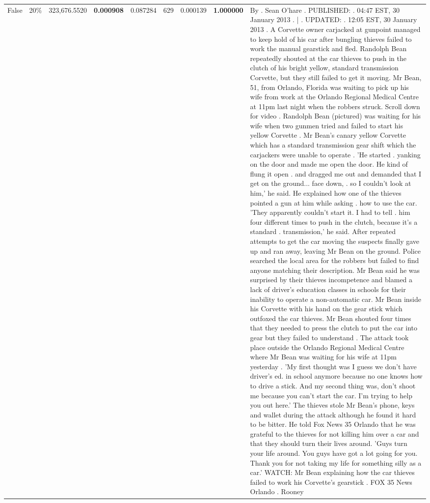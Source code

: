 \begin{table}[H]
\begin{tabular}{llrrrrrrl}
\multirow[c]{16}{*}{False} & 20\% & 323,676.5520 & \bfseries \color{red} 0.000908 & 0.087284 & \color{red} 629 & 0.000139 & \bfseries \color{red} 1.000000 & By . Sean O'hare . PUBLISHED: . 04:47 EST, 30 January 2013 . | . UPDATED: . 12:05 EST, 30 January 2013 . A Corvette owner carjacked at gunpoint managed to keep hold of his car after bungling thieves failed to work the manual gearstick and fled. Randolph Bean repeatedly shouted at the car thieves to push in the clutch of his bright yellow, standard transmission Corvette, but they still failed to get it moving. Mr Bean, 51, from Orlando, Florida was waiting to pick up his wife from work at the Orlando Regional Medical Centre at 11pm last night when the robbers struck. Scroll down for video . Randolph Bean (pictured) was waiting for his wife when two gunmen tried and failed to start his yellow Corvette . Mr Bean's canary yellow Corvette which has a standard transmission gear shift which the carjackers were unable to operate . 'He started . yanking on the door and made me open the door. He kind of flung it open . and dragged me out and demanded that I get on the ground... face down, . so I couldn't look at him,' he said. He explained how one of the thieves pointed a gun at him while asking . how to use the car. 'They apparently couldn't start it. I had to tell . him four different times to push in the clutch, because it's a standard . transmission,' he said. After repeated attempts to get the car moving the suspects finally gave up and ran away, leaving Mr Bean on the ground. Police searched the local area for the robbers but failed to find anyone matching their description. Mr Bean said he was surprised by their thieves incompetence and blamed a lack of driver's education classes in schools for their inability to operate a non-automatic car. Mr Bean inside his Corvette with his hand on the gear stick which outfoxed the car thieves. Mr Bean shouted four times that they needed to press the clutch to put the car into gear but they failed to understand . The attack took place outside the Orlando Regional Medical Centre where Mr Bean was waiting for his wife at 11pm yesterday . 'My first thought was I guess we don't have driver's ed. in school anymore because no one knows how to drive a stick. And my second thing was, don't shoot me because you can't start the car. I'm trying to help you out here.' The thieves stole Mr Bean's phone, keys and wallet during the attack although he found it hard to be bitter. He told Fox News 35 Orlando that he was grateful to the thieves for not killing him over a car and that they should turn their lives around. 'Guys turn your life around. You guys have got a lot going for you. Thank you for not taking my life for something silly as a car.' WATCH: Mr Bean explaining how the car thieves failed to work his Corvette's gearstick . FOX 35 News Orlando . Rooney \\

\end{tabular}
\end{table}
